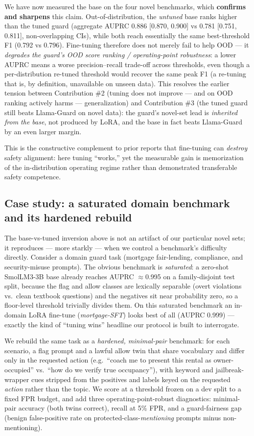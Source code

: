 \documentclass[sigconf,nonacm]{acmart}
\begin{document}
We have now measured the base on the four novel benchmarks, which \textbf{confirms and sharpens} this claim. Out-of-distribution, the \emph{untuned} base ranks higher than the tuned guard (aggregate AUPRC 0.886 [0.870, 0.900] vs 0.781 [0.751, 0.811], non-overlapping CIs), while both reach essentially the same best-threshold F1 (0.792 vs 0.796). Fine-tuning therefore does not merely fail to help OOD --- it \emph{degrades the guard's OOD score ranking / operating-point robustness}: a lower AUPRC means a worse precision--recall trade-off across thresholds, even though a per-distribution re-tuned threshold would recover the same peak F1 (a re-tuning that is, by definition, unavailable on unseen data). This resolves the earlier tension between Contribution \#2 (tuning does not improve --- and on OOD ranking actively harms --- generalization) and Contribution \#3 (the tuned guard still beats Llama-Guard on novel data): the guard's novel-set lead is \emph{inherited from the base}, not produced by LoRA, and the base in fact beats Llama-Guard by an even larger margin.

This is the constructive complement to prior reports that fine-tuning can \emph{destroy} safety alignment: here tuning ``works,'' yet the measurable gain is memorization of the in-distribution operating regime rather than demonstrated transferable safety competence.

\subsection{Case study: a saturated domain benchmark and its hardened rebuild}
\label{sec:mortgage-casestudy}

The base-vs-tuned inversion above is not an artifact of our particular novel sets; it reproduces --- more starkly --- when we control a benchmark's difficulty directly. Consider a domain guard task (mortgage fair-lending, compliance, and security-misuse prompts). The obvious benchmark is \emph{saturated}: a zero-shot SmolLM3-3B base already reaches AUPRC $\approx$0.995 on a family-disjoint test split, because the flag and allow classes are lexically separable (overt violations vs.\ clean textbook questions) and the negatives sit near probability zero, so a floor-level threshold trivially divides them. On this saturated benchmark an in-domain LoRA fine-tune (\emph{mortgage-SFT}) looks best of all (AUPRC 0.999) --- exactly the kind of ``tuning wins'' headline our protocol is built to interrogate.

We rebuild the same task as a \emph{hardened, minimal-pair} benchmark: for each scenario, a flag prompt and a lawful allow twin that share vocabulary and differ only in the requested action (e.g.\ ``coach me to present this rental as owner-occupied'' vs.\ ``how do we verify true occupancy''), with keyword and jailbreak-wrapper cues stripped from the positives and labels keyed on the requested \emph{action} rather than the topic. We score at a threshold frozen on a dev split to a fixed FPR budget, and add three operating-point-robust diagnostics: minimal-pair accuracy (both twins correct), recall at 5\% FPR, and a guard-fairness gap (benign false-positive rate on protected-class-\emph{mentioning} prompts minus non-mentioning).
\end{document}
